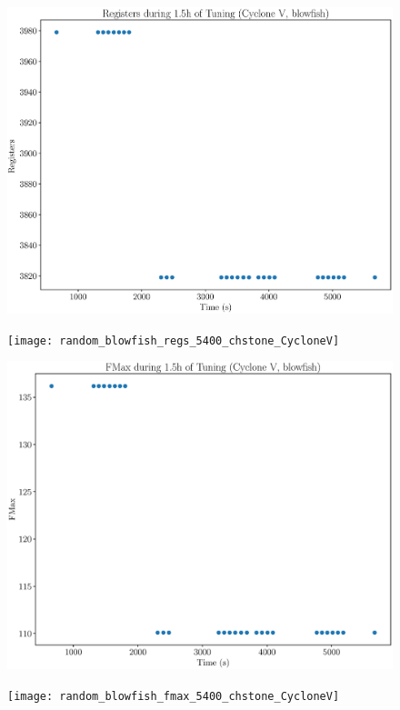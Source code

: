 \documentclass[12pt, a4paper]{article}
\begin{document}
\begin{figure}[htpb]
    \begin{minipage}{.48\textwidth}
        \includegraphics[scale=.25]{blowfish_regs_5400_chstone_CycloneV}
    \end{minipage}%
    \hfill
    \begin{minipage}{.48\textwidth}
        \texttt{[image: random\_blowfish\_regs\_5400\_chstone\_CycloneV]}
    \end{minipage}%

    \begin{minipage}{.48\textwidth}
        \includegraphics[scale=.25]{blowfish_fmax_5400_chstone_CycloneV}
    \end{minipage}%
    \hfill
    \begin{minipage}{.48\textwidth}
        \texttt{[image: random\_blowfish\_fmax\_5400\_chstone\_CycloneV]}
    \end{minipage}%
\end{figure}
\end{document}
